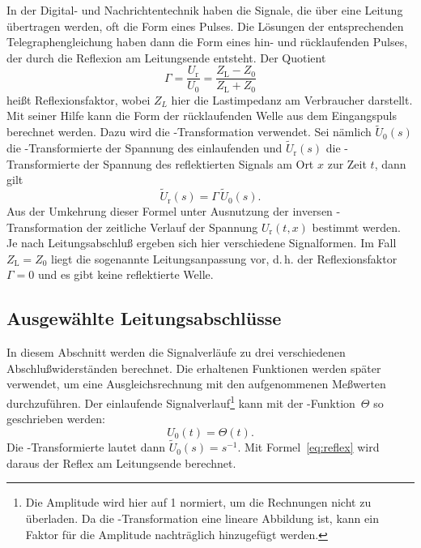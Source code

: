 In der Digital- und Nachrichtentechnik haben die Signale, die
über eine Leitung übertragen werden, oft die Form eines Pulses.
Die Lösungen der entsprechenden Telegraphengleichung haben dann
die Form eines hin- und rücklaufenden Pulses, der durch die
Reflexion am Leitungsende entsteht.  Der Quotient
%
\begin{equation}
\Gamma = \frac{U_\text{r}}{U_0} = \frac{Z_\text{L} - Z_0}{Z_\text{L} + Z_0}
\end{equation}
%
heißt Reflexionsfaktor, wobei $Z_L$ hier die Lastimpedanz am Verbraucher
darstellt.  Mit seiner Hilfe kann die Form der rücklaufenden Welle aus
dem Eingangspuls berechnet werden.  Dazu wird
die -Transformation verwendet.  Sei nämlich
$\tilde{U}_0(s)$ die -Transformierte der Spannung des
einlaufenden und $\tilde{U}_\text{r}(s)$
die -Transformierte der Spannung des reflektierten Signals
am Ort $x$ zur Zeit $t$, dann gilt
%
\begin{equation}
\label{eq:reflex}
\tilde{U}_\text{r}(s) = \Gamma\, \tilde{U}_0(s).
\end{equation}
%
Aus der Umkehrung dieser Formel unter Ausnutzung der
inversen -Transformation der zeitliche Verlauf der
Spannung $U_\text{r}(t, x)$ bestimmt werden.  Je nach
Leitungsabschluß ergeben sich hier verschiedene Signalformen.  Im
Fall $Z_\text{L} = Z_0$ liegt die sogenannte Leitungsanpassung vor,
d.\,h. der Reflexionsfaktor $\Gamma = 0$ und es gibt keine
reflektierte Welle.

\subsection{Ausgewählte Leitungsabschlüsse}
In diesem Abschnitt werden die Signalverläufe zu drei verschiedenen
Abschlußwiderständen berechnet.  Die erhaltenen Funktionen werden später
verwendet, um eine Ausgleichsrechnung mit den aufgenommenen Meßwerten
durchzuführen.  Der einlaufende Signalverlauf\footnote{Die Amplitude
wird hier auf 1 normiert, um die Rechnungen nicht zu überladen.  Da
die -Transformation eine lineare Abbildung ist, kann ein
Faktor für die Amplitude nachträglich hinzugefügt werden.}
kann mit der -Funktion~$\Theta$ so geschrieben werden:
%
\begin{equation}
U_0(t) = \Theta(t).
\end{equation}
%
Die -Transformierte lautet dann $\tilde{U}_0(s) = s^{-1}$.
Mit Formel~\eqref{eq:reflex} wird daraus der Reflex am Leitungsende
berechnet.

